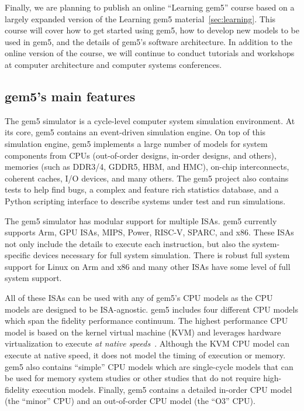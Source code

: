 Finally, we are planning to publish an online ``Learning gem5'' course based on a largely expanded version of the Learning gem5 material~\ref{sec:learning}.
This course will cover how to get started using gem5, how to develop new models to be used in gem5, and the details of gem5's software architecture.
In addition to the online version of the course, we will continue to conduct tutorials and workshops at computer architecture and computer systems conferences.

\subsection{gem5's main features}

The gem5 simulator is a cycle-level computer system simulation environment.
At its core, gem5 contains an event-driven simulation engine.
On top of this simulation engine, gem5 implements a large number of models for system components from CPUs (out-of-order designs, in-order designs, and others), memories (such as DDR3/4, GDDR5, HBM, and HMC), on-chip interconnects, coherent caches, I/O devices, and many others.
The gem5 project also contains tests to help find bugs, a complex and feature rich statistics database, and a Python scripting interface to describe systems under test and run simulations.

The gem5 simulator has modular support for multiple ISAs.
gem5 currently supports Arm, GPU ISAs, MIPS, Power, RISC-V, SPARC, and x86.
These ISAs not only include the details to execute each instruction, but also the system-specific devices necessary for full system simulation.
There is robust full system support for Linux on Arm and x86 and many other ISAs have some level of full system support.

All of these ISAs can be used with any of gem5's CPU models as the CPU models are designed to be ISA-agnostic.
gem5 includes four different CPU models which span the fidelity performance continuum.
The highest performance CPU model is based on the kernel virtual machine (KVM) and leverages hardware virtualization to execute \emph{at native speeds}~\cite{full-speed-ahead}.
Although the KVM CPU model can execute at native speed, it does not model the timing of execution or memory.
gem5 also contains ``simple'' CPU models which are single-cycle models that can be used for memory system studies or other studies that do not require high-fidelity execution models.
Finally, gem5 contains a detailed in-order CPU model (the ``minor'' CPU) and an out-of-order CPU model (the ``O3'' CPU).

